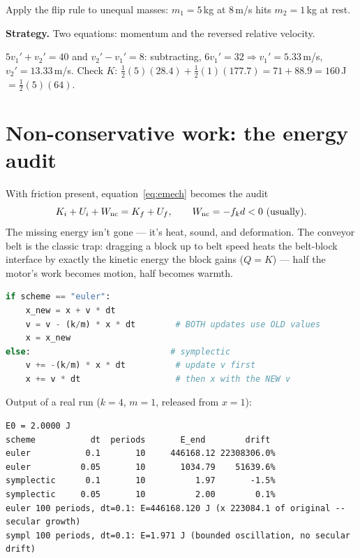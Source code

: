 \begin{example}\label{ex:elasticgen}
Apply the flip rule to unequal masses: $m_1=5$\,kg at $8$\,m/s hits
$m_2=1$\,kg at rest.
\par\smallskip
\textbf{Strategy.} Two equations: momentum and the reversed relative
velocity.
\begin{solution}
$5v_1'+v_2'=40$ and $v_2'-v_1'=8$:
subtracting, $6v_1'=32 \Rightarrow v_1'=5.33$\,m/s,
$v_2'=13.33$\,m/s. Check $K$: $\tfrac12(5)(28.4)+\tfrac12(1)(177.7)=
71+88.9=160$\,J $=\tfrac12(5)(64)$. \checkmark
\end{solution}
\end{example}

\section{Non-conservative work: the energy audit}\label{sec:en-noncons}

With friction present, equation~\eqref{eq:emech} becomes the audit
\[
  K_i+U_i+W_{\rm nc}=K_f+U_f,
  \qquad W_{\rm nc}=-f_kd<0 \ \text{(usually)}.
\]
The missing energy isn't gone --- it's heat, sound, and deformation. The
conveyor belt is the classic trap: dragging a block up to belt speed
heats the belt-block interface by exactly the kinetic energy the block
gains ($Q=K$) --- half the motor's work becomes motion, half becomes
warmth.

\begin{lstlisting}[language=Python,caption={\texttt{code/ch04\_energy\_check.py} --- plain Euler vs symplectic Euler on a block-spring.},label={lst:edrift}]
if scheme == "euler":
    x_new = x + v * dt
    v = v - (k/m) * x * dt        # BOTH updates use OLD values
    x = x_new
else:                            # symplectic
    v += -(k/m) * x * dt          # update v first
    x += v * dt                   # then x with the NEW v
\end{lstlisting}

Output of a real run ($k=4$, $m=1$, released from $x=1$):
\begin{lstlisting}[numbers=none]
E0 = 2.0000 J
scheme           dt  periods       E_end        drift
euler           0.1       10     446168.12 22308306.0%
euler          0.05       10       1034.79    51639.6%
symplectic      0.1       10          1.97       -1.5%
symplectic     0.05       10          2.00        0.1%
euler 100 periods, dt=0.1: E=446168.120 J (x 223084.1 of original -- secular growth)
sympl 100 periods, dt=0.1: E=1.971 J (bounded oscillation, no secular drift)
\end{lstlisting}

